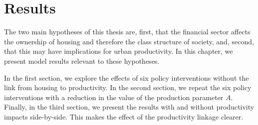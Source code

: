 \chapter{Results} \label{chapter-results}

The two main hypotheses of this thesis are, first, that the financial sector affects the ownership of housing and therefore the class structure of society, and, second, that this may have implications for urban productivity.  In this chapter, we present model results relevant to these hypotheses.

In the first section, we explore the effects of six policy interventions without the link from housing to productivity. In the second section, we repeat the six policy interventions with a %
reduction in the value of the production parameter $A$. Finally, in the third section, we present the results with and without productivity impacts side-by-side. This makes the effect of the productivity linkage clearer.


